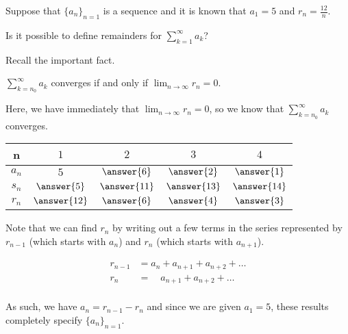 \documentclass{ximera}
\author{Jim Talamo}
\begin{document}
\begin{exercise}

Suppose that $\{a_n\}_{n=1}$ is a sequence and it is known that $a_1 =5$ and $r_n = \frac{12}{n}$.

Is it possible to define remainders for $\sum_{k=1}^{\infty} a_k$?

\begin{multipleChoice}
\end{multipleChoice}

\begin{feedback}
Recall the important fact.

\begin{fact}
$\sum_{k=n_0}^\infty a_k$ converges if and only if $\lim_{n \to \infty} r_n = 0$.  
\end{fact}
Here, we have immediately that $\lim_{n \to \infty} r_n = 0$, so we know that $\sum_{k=n_0}^\infty a_k$ converges.

\end{feedback}

\begin{exercise}
\begin{center}
\begin{tabular}{c | c | c | c | c }
n& $1$ & $2$ & $3$ & $4$ \\ [2 ex]
\hline
$a_n$ & $ 5$ &$ \answer{6}$ & $ \answer{2}$ & $ \answer{1}$  \\ [2 ex]
\hline
$s_n$ & $ \answer{5}$ &$ \answer{11}$ & $ \answer{13}$ & $ \answer{14}$  \\ [2 ex]
\hline
$r_n$ & $ \answer{12}$ & $ \answer{6}$ & $ \answer{4}$ & $ \answer{3}$ 
\end{tabular}
\end{center}

\begin{hint}
Note that we can find $r_n$ by writing out a few terms in the series represented by $r_{n-1}$ (which starts with $a_n$) and $r_n$ (which starts with $a_{n+1}$).

\begin{align*}
r_{n-1} &= a_n+a_{n+1}+a_{n+2}+\ldots \\
r_{n} &= \phantom{a_n}  a_{n+1}+a_{n+2}+\ldots \\
\end{align*}

As such, we have $a_n = r_{n-1}-r_n$ and since we are given $a_1=5$, these results completely specify $\{a_n\}_{n=1}$.
\end{hint}


\end{exercise}
\end{exercise}
\end{document}
